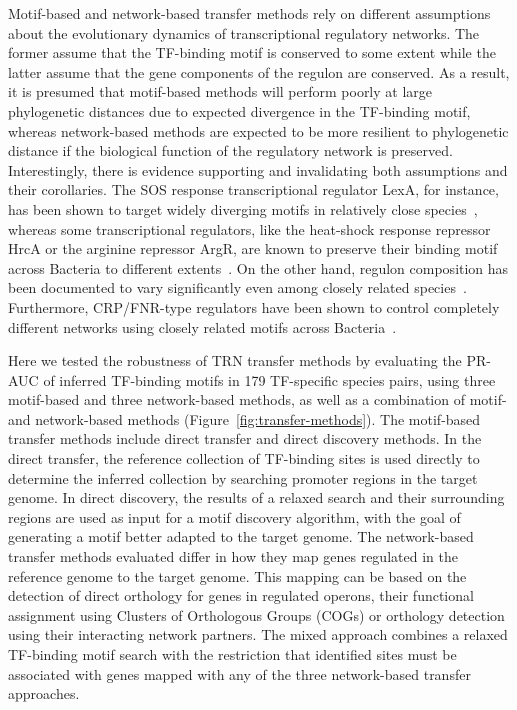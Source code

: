 Motif-based and network-based transfer methods rely on different assumptions
about the evolutionary dynamics of transcriptional regulatory networks. The
former assume that the TF-binding motif is conserved to some extent while the
latter assume that the gene components of the regulon are conserved. As a
result, it is presumed that motif-based methods will perform poorly at large
phylogenetic distances due to expected divergence in the TF-binding motif,
whereas network-based methods are expected to be more resilient to phylogenetic
distance if the biological function of the regulatory network is
preserved. Interestingly, there is evidence supporting and invalidating both
assumptions and their corollaries. The SOS response transcriptional regulator
LexA, for instance, has been shown to target widely diverging motifs in
relatively close species~\cite{erill2007aeons}, whereas some transcriptional
regulators, like the heat-shock response repressor HrcA or the arginine
repressor ArgR, are known to preserve their binding motif across Bacteria to
different extents~\cite{makarova2001conservation, gelfand1999recognition}. On
the other hand, regulon composition has been documented to vary significantly
even among closely related species~\cite{erill2004differences,
  venancio2009reconstructing, baumbach2010power,
  price2007orthologous}. Furthermore, CRP/FNR-type regulators have been shown
to control completely different networks using closely related motifs across
Bacteria~\cite{dufour2010reconstruction, matsui2013comprehensive}.

Here we tested the robustness of TRN transfer methods by evaluating the PR-AUC
of inferred TF-binding motifs in 179 TF-specific species pairs, using three
motif-based and three network-based methods, as well as a combination of motif-
and network-based methods (Figure~\ref{fig:transfer-methods}). The motif-based
transfer methods include direct transfer and direct discovery methods. In the
direct transfer, the reference collection of TF-binding sites is used directly
to determine the inferred collection by searching promoter regions in the
target genome. In direct discovery, the results of a relaxed search and their
surrounding regions are used as input for a motif discovery algorithm, with the
goal of generating a motif better adapted to the target genome. The
network-based transfer methods evaluated differ in how they map genes regulated
in the reference genome to the target genome. This mapping can be based on the
detection of direct orthology for genes in regulated operons, their functional
assignment using Clusters of Orthologous Groups (COGs) or orthology detection
using their interacting network partners. The mixed approach combines a relaxed
TF-binding motif search with the restriction that identified sites must be
associated with genes mapped with any of the three network-based transfer
approaches.

